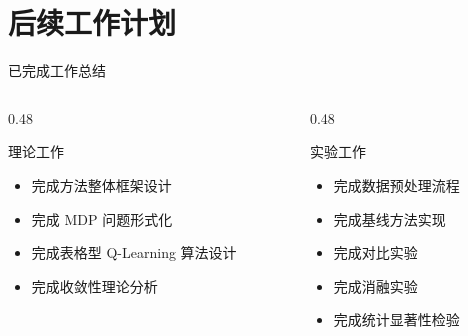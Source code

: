 \section{后续工作计划}

\begin{frame}{已完成工作总结}
    \begin{columns}[T]
        \begin{column}{0.48\textwidth}
            \begin{block}{\normalsize {理论工作}}
                \begin{itemize}
                    \item[\textcolor{accentgreen}{\checkmark}] 完成方法整体框架设计
                    \item[\textcolor{accentgreen}{\checkmark}] 完成 MDP 问题形式化
                    \item[\textcolor{accentgreen}{\checkmark}] 完成表格型 Q-Learning 算法设计
                    \item[\textcolor{accentgreen}{\checkmark}] 完成收敛性理论分析
                \end{itemize}
            \end{block}
        \end{column}

        \begin{column}{0.48\textwidth}
            \begin{block}{\normalsize {实验工作}}
                \begin{itemize}
                    \item[\textcolor{accentgreen}{\checkmark}] 完成数据预处理流程
                    \item[\textcolor{accentgreen}{\checkmark}] 完成基线方法实现
                    \item[\textcolor{accentgreen}{\checkmark}] 完成对比实验
                    \item[\textcolor{accentgreen}{\checkmark}] 完成消融实验
                    \item[\textcolor{accentgreen}{\checkmark}] 完成统计显著性检验
                \end{itemize}
            \end{block}
        \end{column}
    \end{columns}
\end{frame}

